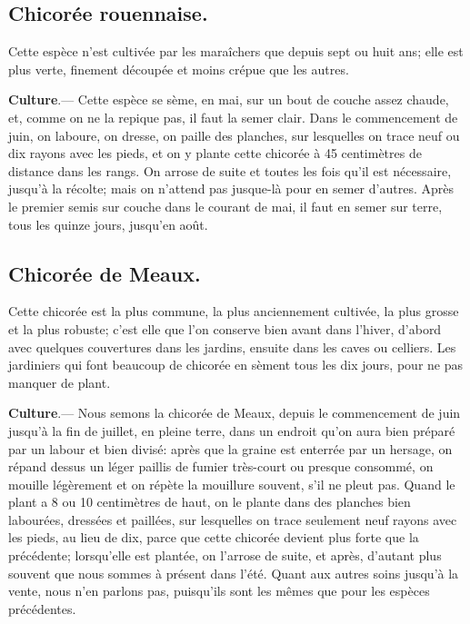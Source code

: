 \documentclass[10pt,a4paper]{book}
\begin{document}
\subsection{Chicorée rouennaise.}

Cette espèce n'est cultivée par les maraîchers que depuis sept ou huit ans; elle est plus verte, finement découpée et moins crépue que les autres.

\textbf{Culture}.--- Cette espèce se sème, en mai, sur un bout de couche assez chaude, et, comme on ne la repique pas, il faut la semer clair. Dans le commencement de juin, on laboure, on dresse, on paille des planches, sur lesquelles on trace neuf ou dix rayons avec les pieds, et on y plante cette chicorée à 45 centimètres de distance dans les rangs. On arrose de suite et toutes les fois qu'il est nécessaire, jusqu'à la récolte; mais on n'attend pas jusque-là pour en semer d'autres. Après le premier semis sur couche dans le courant de mai, il faut en semer sur terre, tous les quinze jours, jusqu'en août.

\subsection{Chicorée de Meaux.}

Cette chicorée est la plus commune, la plus anciennement cultivée, la plus grosse et la plus robuste; c'est elle que l'on conserve bien avant dans l'hiver, d'abord avec quelques couvertures dans les jardins, ensuite dans les caves ou celliers. Les jardiniers qui font beaucoup de chicorée en sèment tous les dix jours, pour ne pas manquer de plant.

\textbf{Culture}.--- Nous semons la chicorée de Meaux, depuis le commencement de juin jusqu'à la fin de juillet, en pleine terre, dans un endroit qu'on aura bien préparé par un labour et bien divisé: après que la graine est enterrée par un hersage, on répand dessus un léger paillis de fumier très-court ou presque consommé, on mouille légèrement et on répète la mouillure souvent, s'il ne pleut pas. Quand le plant a 8 ou 10 centimètres de haut, on le plante dans des planches bien labourées, dressées et paillées, sur lesquelles on trace seulement neuf rayons avec les pieds, au lieu de dix, parce que cette chicorée devient plus forte que la précédente; lorsqu'elle est plantée, on l'arrose de suite, et après, d'autant plus souvent que nous sommes à présent dans l'été. Quant aux autres soins jusqu'à la vente, nous n'en parlons pas, puisqu'ils sont les mêmes que pour les espèces précédentes.
\end{document}
